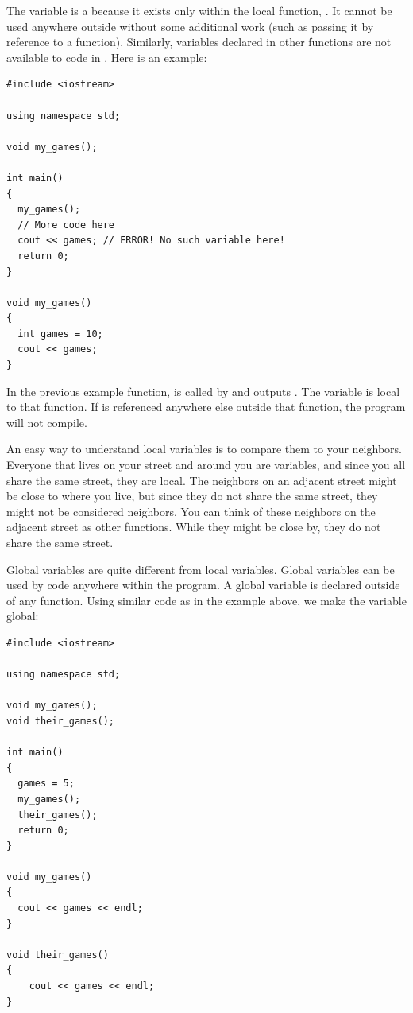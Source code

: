 The variable  is a  because it exists only within the local function, . 
It cannot be used anywhere outside  without some additional work (such as passing it by reference to a function). 
Similarly, variables declared in other functions are not available to code in . 
Here is an example:

\noindent\begin{minipage}{\linewidth}\begin{lstlisting}
#include <iostream>

using namespace std;
	
void my_games();

int main()
{
  my_games();
  // More code here
  cout << games; // ERROR! No such variable here!
  return 0;
}

void my_games()
{
  int games = 10;
  cout << games;
}
\end{lstlisting}\end{minipage}

In the previous example function,  is called by  and outputs .
The variable  is local to that function. 
If  is referenced anywhere else outside that function, the program will not compile.

An easy way to understand local variables is to compare them to your neighbors. 
Everyone that lives on your street and around you are variables, and since you all share the same street, they are local. 
The neighbors on an adjacent street might be close to where you live, but since they do not share the same street, they might not be considered neighbors. 
You can think of these neighbors on the adjacent street as other functions. 
While they might be close by, they do not share the same street.

Global variables are quite different from local variables. 
Global variables can be used by code anywhere within the program. 
A global variable is declared outside of any function. 
Using similar code as in the example above, we make the  variable global:

\noindent\begin{minipage}{\linewidth}\begin{lstlisting}
#include <iostream>

using namespace std;

void my_games();
void their_games();

int main()
{
  games = 5;
  my_games();
  their_games();
  return 0;
}

void my_games()
{
  cout << games << endl;
}

void their_games()
{
	cout << games << endl;
}
\end{lstlisting}\end{minipage}

